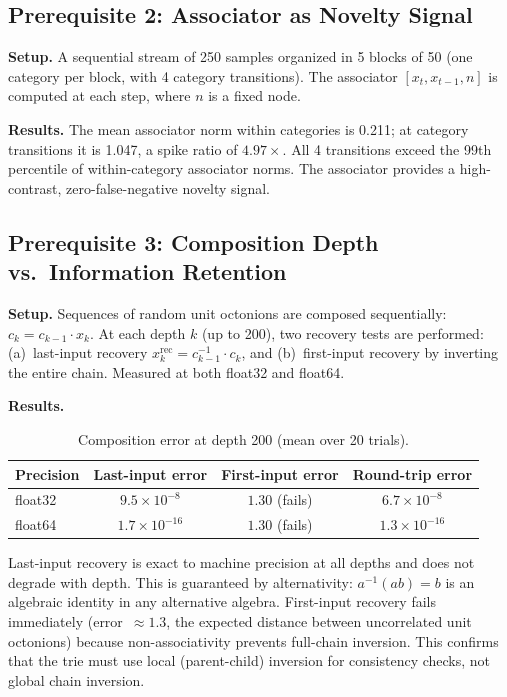 \documentclass[11pt,a4paper]{article}
\theoremstyle{definition}
\theoremstyle{remark}
\begin{document}
\subsection{Prerequisite 2: Associator as Novelty Signal}

\textbf{Setup.} A sequential stream of 250 samples organized in 5 blocks of 50 (one category per block, with 4 category transitions). The associator $[x_t, x_{t-1}, n]$ is computed at each step, where $n$ is a fixed node.

\textbf{Results.} The mean associator norm within categories is 0.211; at category transitions it is 1.047, a spike ratio of $4.97\times$. All 4 transitions exceed the 99th percentile of within-category associator norms. The associator provides a high-contrast, zero-false-negative novelty signal.

\subsection{Prerequisite 3: Composition Depth vs.\ Information Retention}

\textbf{Setup.} Sequences of random unit octonions are composed sequentially: $c_k = c_{k-1} \cdot x_k$. At each depth $k$ (up to 200), two recovery tests are performed: (a)~last-input recovery $x_k^{\text{rec}} = c_{k-1}^{-1} \cdot c_k$, and (b)~first-input recovery by inverting the entire chain. Measured at both float32 and float64.

\textbf{Results.}

\begin{table}[ht]
\centering
\caption{Composition error at depth 200 (mean over 20 trials).}
\label{tab:depth}
\begin{tabular}{@{}lccc@{}}
\toprule
Precision & Last-input error & First-input error & Round-trip error \\
\midrule
float32 & $9.5 \times 10^{-8}$ & $1.30$ (fails) & $6.7 \times 10^{-8}$ \\
float64 & $1.7 \times 10^{-16}$ & $1.30$ (fails) & $1.3 \times 10^{-16}$ \\
\bottomrule
\end{tabular}
\end{table}

Last-input recovery is exact to machine precision at all depths and does not degrade with depth. This is guaranteed by alternativity: $a^{-1}(ab) = b$ is an algebraic identity in any alternative algebra. First-input recovery fails immediately (error~$\approx 1.3$, the expected distance between uncorrelated unit octonions) because non-associativity prevents full-chain inversion. This confirms that the trie must use local (parent-child) inversion for consistency checks, not global chain inversion.
\end{document}
